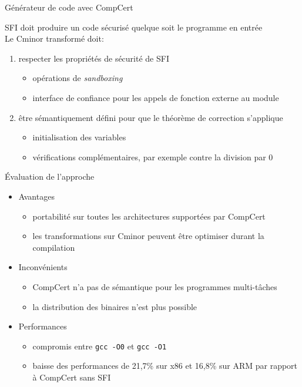 \documentclass[10pt,usenames,dvipsnames]{beamer}
\begin{document}
\begin{frame}{Générateur de code avec CompCert}

	{\large SFI doit produire un code sécurisé quelque soit le programme en entrée}\\
	\vspace{5mm}
	Le Cminor transformé doit:
	\begin{enumerate}
		\item respecter les propriétés de sécurité de SFI
			\begin{itemize}
				\item opérations de \textit{sandboxing}
				\item interface de confiance pour les appels de fonction externe au module
			\end{itemize}
		\item \^etre sémantiquement défini pour que le théorème de correction s'applique
			\begin{itemize}
				\item initialisation des variables
				\item vérifications complémentaires, par exemple contre la division par 0
			\end{itemize}
	\end{enumerate}
\end{frame}

\begin{frame}{\'Evaluation de l'approche}
	\begin{itemize}
		\item Avantages
			\begin{itemize}
				\item portabilité sur toutes les architectures supportées par CompCert
				\item les transformations sur Cminor  peuvent être optimiser durant la compilation
			\end{itemize}
		\item Inconvénients
			\begin{itemize}
				\item CompCert n'a pas de sémantique pour les programmes  multi-tâches
				\item la distribution des binaires n'est plus possible
			\end{itemize}
		\item Performances
			\begin{itemize}
				\item compromis entre \texttt{gcc -O0} et \texttt{gcc -O1}
				\item baisse des performances de 21,7\% sur x86 et 16,8\% sur ARM par rapport à CompCert sans SFI
			\end{itemize}
	\end{itemize}
\end{frame}
\end{document}
